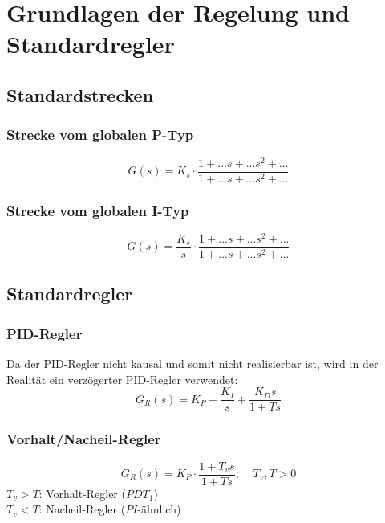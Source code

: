 \documentclass[a4paper,twocolumn,10pt]{article}
\begin{document}
\section{Grundlagen der Regelung und Standardregler}

\subsection{Standardstrecken}

\subsubsection{Strecke vom globalen P-Typ}
\begin{equation*}
G(s)=K_s\cdot\frac{1+...s+...s^2+...}{1+...s+...s^2+...}
\end{equation*}

\subsubsection{Strecke vom globalen I-Typ}
\begin{equation*}
G(s)=\frac{K_s}{s}\cdot\frac{1+...s+...s^2+...}{1+...s+...s^2+...}
\end{equation*}

\subsection{Standardregler}

\subsubsection{PID-Regler}
Da der PID-Regler nicht kausal und somit nicht realisierbar ist, wird in der Realität ein verzögerter PID-Regler verwendet:
\begin{equation*}
G_R(s)=K_P+\frac{K_I}{s}+\frac{K_Ds}{1+Ts}
\end{equation*}

\subsubsection{Vorhalt/Nacheil-Regler}
\begin{equation*}
G_R(s)=K_P\cdot\frac{1+T_vs}{1+Ts};\;\;\;\;T_v,T>0
\end{equation*}
$T_v>T$: Vorhalt-Regler ($PDT_1$)\\
$T_v<T$: Nacheil-Regler ($PI$-ähnlich)
\end{document}
